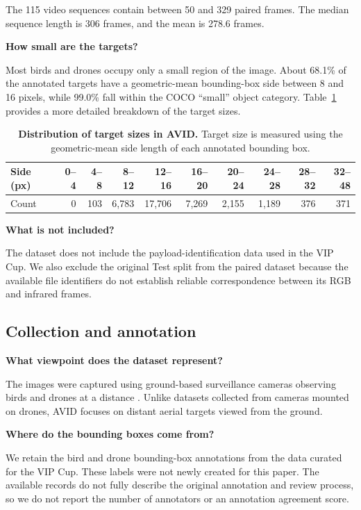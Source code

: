 \documentclass[10pt]{article}
\newcommand{\dataset}{\textsc{AVID}}
\begin{document}
The 115 video sequences contain between 50 and 329 paired frames. The median sequence length is 306 frames, and the mean is 278.6 frames.

\textbf{How small are the targets?}

Most birds and drones occupy only a small region of the image. About 68.1\% of the annotated targets have a geometric-mean bounding-box side between 8 and 16 pixels, while 99.0\% fall within the COCO ``small'' object category. Table~\ref{tab:scalehist} provides a more detailed breakdown of the target sizes.

\begin{table}[h]
\centering
\caption{\textbf{Distribution of target sizes in \dataset{}.}
Target size is measured using the geometric-mean side length of each annotated bounding box.}
\label{tab:scalehist}
\small
\begin{tabular}{lrrrrrrrrr}
\toprule
Side (px)
& 0--4 & 4--8 & 8--12 & 12--16 & 16--20
& 20--24 & 24--28 & 28--32 & 32--48 \\
\midrule
Count
& 0 & 103 & 6,783 & 17,706 & 7,269
& 2,155 & 1,189 & 376 & 371 \\
\bottomrule
\end{tabular}
\end{table}

\textbf{What is not included?}

The dataset does not include the payload-identification data used in the VIP Cup. We also exclude the original Test split from the paired dataset because the available file identifiers do not establish reliable correspondence between its RGB and infrared frames.

\subsection{Collection and annotation}

\textbf{What viewpoint does the dataset represent?}

The images were captured using ground-based surveillance cameras observing birds and drones at a distance \citep{svanstrom2021multisensor}. Unlike datasets collected from cameras mounted on drones, \dataset{} focuses on distant aerial targets viewed from the ground.

\textbf{Where do the bounding boxes come from?}

We retain the bird and drone bounding-box annotations from the data curated for the VIP Cup. These labels were not newly created for this paper. The available records do not fully describe the original annotation and review process, so we do not report the number of annotators or an annotation agreement score.
\end{document}
